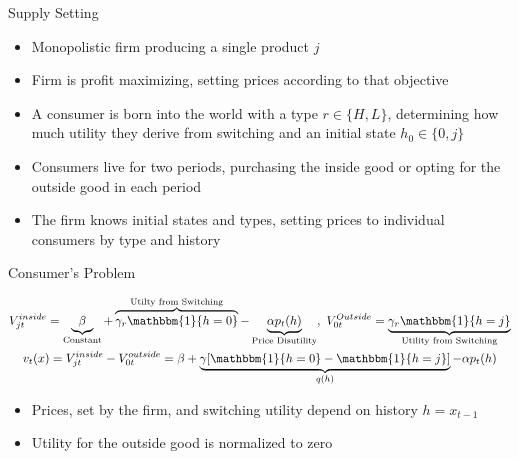 \documentclass[aspectratio=169,professionalfonts]{beamer}
\newcommand{\shortbuttons}{}
\begin{document}
\gdef\shortbuttons{}
\begin{frame}[label=short-6]{Supply Setting}
  \begin{itemize}
    \item Monopolistic firm producing a single product $j$
    \item Firm is profit maximizing, setting prices according to that objective
    \item A consumer is born into the world with a type $r\in\{H,L\}$, determining how much utility they derive from switching and an initial state $h_0\in\{0,j\}$
    \item Consumers live for two periods, purchasing the inside good or opting for the outside good in each period
    \item The firm knows initial states and types, setting prices to individual consumers by type and history
  \end{itemize}
\end{frame}


\gdef\shortbuttons{}
\begin{frame}[label=short-7]{Consumer's Problem}
  \begin{tcolorbox}[
    boxsep=0pt,
    left=2pt, right=2pt,
    top=1pt, bottom=1pt,
    before skip=2pt, after skip=2pt
    ]
    \setlength{\abovedisplayskip}{2pt}
    \setlength{\belowdisplayskip}{2pt}
    \begin{gather*}
      V^{inside}_{jt} = \underbrace{\beta}_{\text{Constant}} + \overbrace{\gamma_r\mathbbm{1}\{h=0\}}^{\text{Utilty from Switching}} - \underbrace{\alpha p_t(h)}_{\text{Price Disutility}}, \ V^{Outside}_{0t} = \underbrace{\gamma_r\mathbbm{1}\{h=j\}}_{\text{Utility from Switching}} \\
      v_t(x) = V_{jt}^{inside} - V_{0t}^{outside} = \beta + \underbrace{\gamma[\mathbbm{1}\{h=0\} - \mathbbm{1}\{h=j\}]}_{q(h)} - \alpha p_t(h)
    \end{gather*}
  \end{tcolorbox}
  \begin{itemize}\setlength{\itemsep}{2pt}
    \item Prices, set by the firm, and switching utility depend on history $h=x_{t-1}$
    \item Utility for the outside good is normalized to zero
  \end{itemize}
\end{frame}
\end{document}

